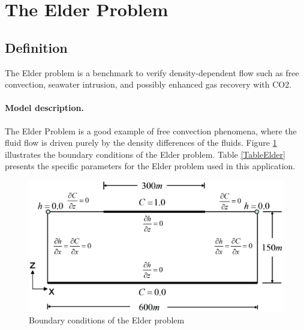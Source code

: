 \section{The Elder Problem}
\subsection{Definition}
The Elder problem is a benchmark to verify density-dependent flow such as free convection, seawater intrusion, and possibly enhanced gas recovery with CO2.
\paragraph*{Model description.}
The Elder Problem is a good example of free convection phenomena, where the fluid flow is driven purely by the density differences of the fluids. Figure \ref{ElderProblemBC} illustrates the boundary conditions of the Elder problem. Table \ref{TableElder} presents the specific parameters for the Elder problem used in this application.
\begin{figure}[h]
\centering
\includegraphics[scale=0.25]{PART_III/DDF/figures/elder_bc.eps}
\caption{Boundary conditions of the Elder problem}
\label{ElderProblemBC}
\end{figure}

